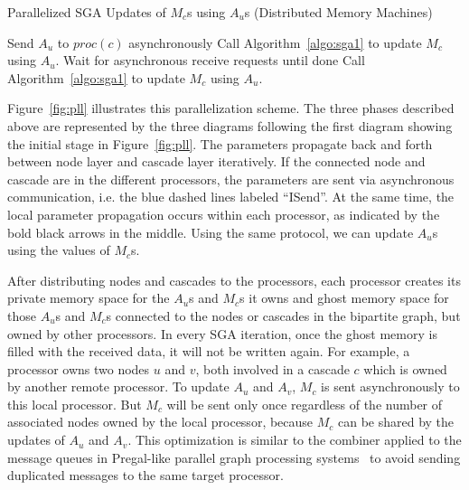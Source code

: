 \begin{algorithm}
\caption{Parallelized SGA Updates of $M_c$s using $A_u$s (Distributed Memory Machines)}\label{algo:3}
\begin{algorithmic}[1]
\State Send $A_u$ to $proc(c)$ asynchronously
\EndFor
\State Call Algorithm~\ref{algo:sga1} to update $M_c$ using $A_u$.
\EndFor
\State Wait for asynchronous receive requests until done
\State Call Algorithm~\ref{algo:sga1} to update $M_c$ using $A_u$.
\EndFor
\end{algorithmic}
\end{algorithm}

Figure~\ref{fig:pll} illustrates this parallelization scheme. The three phases described above are represented by the three diagrams following the first diagram showing the initial stage in Figure~\ref{fig:pll}. The parameters propagate back and forth between node layer and cascade layer iteratively. If the connected node and cascade are in the different processors, the parameters are sent via asynchronous communication, i.e. the blue dashed lines labeled ``ISend''. At the same time, the local parameter propagation occurs within each processor, as indicated by the bold black arrows in the middle. Using the same protocol, we can update $A_u$s using the values of $M_c$s.

After distributing nodes and cascades to the processors, each processor creates its private memory space for the $A_u$s and $M_c$s it owns and ghost memory space for those $A_u$s and $M_c$s connected to the nodes or cascades in the bipartite graph, but owned by other processors. In every SGA iteration, once the ghost memory is filled with the received data, it will not be written again. For example, a processor owns two nodes $u$ and $v$, both involved in a cascade $c$ which is owned by another remote processor. To update $A_u$ and $A_v$, $M_c$ is sent asynchronously to this local processor. But $M_c$ will be sent only once regardless of the number of associated nodes owned by the local processor, because $M_c$ can be shared by the updates of $A_u$ and $A_v$. This optimization is similar to the combiner applied to the message queues in Pregal-like parallel graph processing systems~\cite{malewicz2010pregel,avery2011giraph} to avoid sending duplicated messages to the same target processor.

